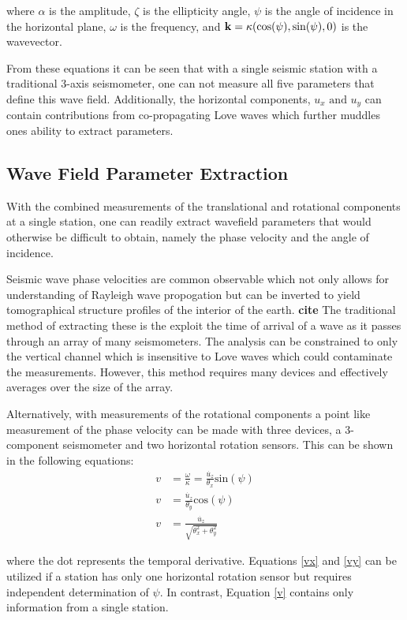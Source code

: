 \documentclass [12pt, proquest]{uwthesis}[2019]
\begin{document}
where $\alpha$ is the amplitude, $\zeta$ is the ellipticity angle, $\psi$ is the angle of incidence in the horizontal plane, $\omega$ is the frequency, and $\bf{k}=\kappa (\text{cos}(\psi),\text{sin}(\psi),\text{0})$ is the wavevector.

From these equations it can be seen that with a single seismic station with a traditional 3-axis seismometer, one can not measure all five parameters that define this wave field. Additionally, the horizontal components, $u_x\text{ and }u_y$ can contain contributions from co-propagating Love waves which further muddles ones ability to extract parameters. 

\subsection{Wave Field Parameter Extraction}

With the combined measurements of the translational and rotational components at a single station, one can readily extract wavefield parameters that would otherwise be difficult to obtain, namely the phase velocity and the angle of incidence. 

Seismic wave phase velocities are common observable which not only allows for understanding of Rayleigh wave propogation but can be inverted to yield tomographical structure profiles of the interior of the earth. \textbf{cite} The traditional method of extracting these is the exploit the time of arrival of a wave as it passes through an array of many seismometers. The analysis can be constrained to only the vertical channel which is insensitive to Love waves which could contaminate the measurements. However, this method requires many devices and effectively averages over the size of the array.

Alternatively, with measurements of the rotational components a point like measurement of the phase velocity can be made with three devices, a 3-component seismometer and two horizontal rotation sensors. This can be shown in the following equations:
\begin{align} 
v&=\frac{\omega}{\kappa} = \frac{\dot{u_z}}{\theta_x}\text{sin}(\psi) \label{vx} \\
v&=\frac{\dot{u_z}}{\theta_y}\text{cos}(\psi)\label{vy} \\
v&=\frac{\dot{u_z}}{\sqrt{\theta_x^2+\theta_y^2}} \label{v}
\end{align}

where the dot represents the temporal derivative. Equations \ref{vx} and \ref{vy} can be utilized if a station has only one horizontal rotation sensor but requires independent determination of $\psi$. In contrast, Equation \ref{v} contains only information from a single station.
\end{document}
